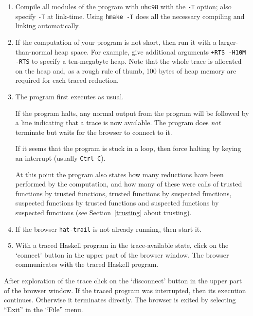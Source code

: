\documentclass[12pt]{article}
\begin{document}
\begin{enumerate}
\item
Compile all modules of the program with \texttt{nhc98} with the \texttt{-T} option; also specify \texttt{-T} at link-time.  Using \texttt{hmake -T} does
all the necessary compiling and linking automatically.

\item
If the computation of your program is not short, then run it with a larger-than-normal heap space.
For example, give additional arguments \texttt{+RTS -H10M -RTS} to specify a ten-megabyte heap.
Note that the whole trace is allocated on the heap and, as a rough rule of thumb, 100 bytes of heap memory are required for each traced reduction.

\item
The program first executes as usual.

If the program halts, any normal output from the program will
be followed by a line indicating that a trace is
now available.  The program does \emph{not} terminate but waits
for the browser to connect to it.
   
If it seems that the program is stuck in a loop, then
force halting by keying an interrupt
(usually \texttt{Ctrl-C}).

At this point the program also states how many reductions have been performed by the computation, and how many of these were calls of trusted functions by trusted functions, trusted functions by suspected functions, suspected functions by trusted functions and suspected functions by suspected functions (see Section~\ref{trusting} about trusting).

\item
If the browser \texttt{hat-trail} is not already running, then start it.

\item
With a traced Haskell program in the trace-available
state, click on the `connect' button in the upper part
of the browser window.  
The browser communicates with the traced Haskell program.
\end{enumerate}

After exploration of the trace click on the `disconnect' button in the upper part of the browser window. If the traced program was interrupted, then its execution continues. Otherwise it terminates directly.
The browser is exited by selecting ``Exit'' in the ``File'' menu.

\end{document}
